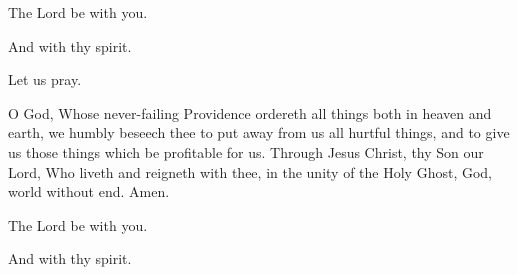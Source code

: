

\rubric{\Vbar}The Lord be with you.

\rubric{\Rbar}And with thy spirit.

Let us pray.

O God, Whose never-failing Providence ordereth all things both in heaven and earth, we humbly beseech thee to put away from us all hurtful things, and to give us those things which be profitable for us.
Through Jesus Christ, thy Son our Lord, Who liveth and reigneth with thee, in the unity of the Holy Ghost, God, world without end. \rubric{\Rbar} Amen.

\rubric{\Vbar}The Lord be with you.

\rubric{\Rbar}And with thy spirit.